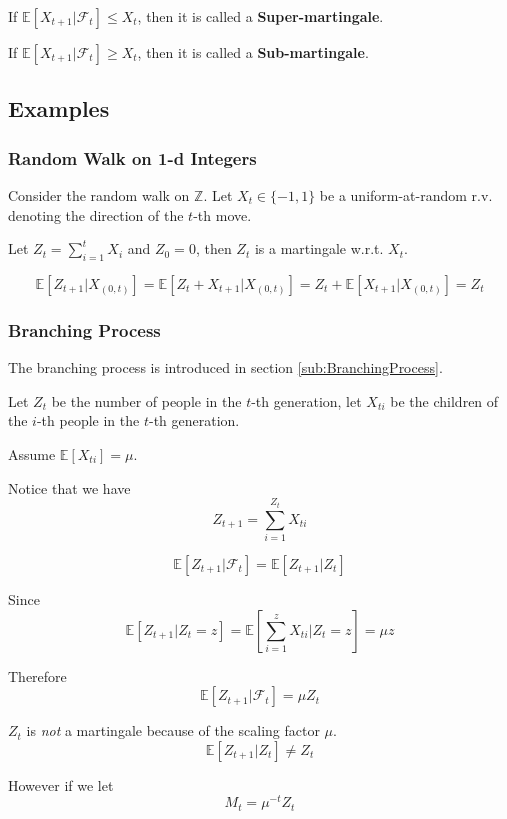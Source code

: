         \begin{remark}
            If $\mathbb{E}[X_{t+1}|\mathcal{F}_t] \le X_t$, then it is called a \textbf{Super-martingale}.

            If $\mathbb{E}[X_{t+1}|\mathcal{F}_t] \ge X_t$, then it is called a \textbf{Sub-martingale}.
        \end{remark}

    \subsection{Examples}
        \subsubsection{Random Walk on 1-d Integers}
        Consider the random walk on $\mathbb{Z}$. Let $X_t \in \{-1, 1\}$ be a uniform-at-random r.v. denoting the direction of the $t$-th move.

        Let $Z_t = \sum_{i=1}^tX_i$ and $Z_0=0$, then $Z_t$ is a martingale w.r.t. $X_t$.

        \[ \mathbb{E}[Z_{t+1}|X_{(0,t)}] = \mathbb{E}[Z_t + X_{t+1}|X_{(0,t)}] = Z_t + \mathbb{E}[X_{t+1}|X_{(0,t)}] = Z_t \]

        \subsubsection{Branching Process}
        The branching process is introduced in section \ref{sub:BranchingProcess}.

        Let $Z_t$ be the number of people in the $t$-th generation, let $X_{ti}$ be the children of the $i$-th people in the $t$-th generation.

        Assume $\mathbb{E}[X_{ti}] = \mu$.

        Notice that we have
        \[ Z_{t+1} = \sum_{i=1}^{Z_t}X_{ti} \]

        \[ \mathbb{E}[Z_{t+1}|\mathcal{F}_t] = \mathbb{E}[Z_{t+1}|Z_t] \]

        Since
        \[ \mathbb{E}[Z_{t+1}|Z_t=z] = \mathbb{E}[\sum_{i=1}^zX_{ti}|Z_t=z] = \mu z \]

        Therefore
        \[ \mathbb{E}[Z_{t+1}|\mathcal{F}_t] = \mu Z_t \]

        $Z_t$ is \emph{not} a martingale because of the scaling factor $\mu$.
        \[ \mathbb{E}[Z_{t+1}|Z_t] \neq Z_t \]

        However if we let
        \[ M_t = \mu^{-t}Z_t \]

